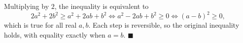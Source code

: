 Multiplying by \(2\), the inequality is equivalent to
\[
2a^2+2b^2\ge a^2+2ab+b^2\iff a^2-2ab+b^2\ge0\iff (a-b)^2\ge0,
\]
which is true for all real \(a,b\). Each step is reversible, so the original inequality holds, with equality exactly when \(a=b\). \(\blacksquare\)
